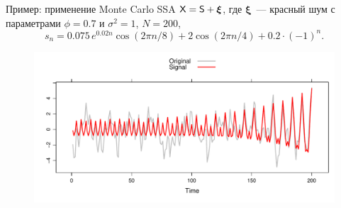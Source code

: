 \documentclass[notheorems, handout]{beamer}
\begin{document}
\begin{frame}{Пример: применение Monte Carlo SSA}
	$\mathsf{X}=\mathsf{S}+\boldsymbol{\xi}$, где $\boldsymbol{\xi}$~--- красный шум с параметрами $\phi=0.7$ и $\sigma^2=1$, $N=200$,
	$$
	s_n=0.075\,e^{0.02n}\cos(2\pi n / 8) + 2\cos(2\pi n / 4) + 0.2\cdot (-1)^n.
	$$
	\begin{figure}
		\centering
		\includegraphics[width=\textwidth]{img/noise_ts_signal.pdf}
	\end{figure}
\end{frame}
\end{document}
